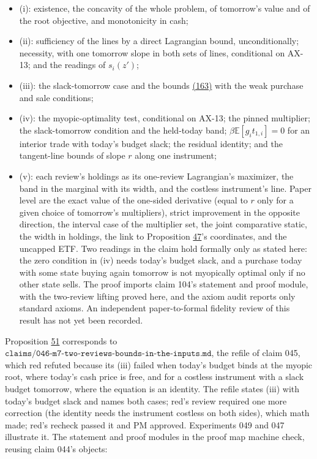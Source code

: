 \documentclass[11pt]{article}
\begin{document}
\begin{itemize}
  \item (i): existence, the concavity of the whole problem, of tomorrow's
  value and of the root objective, and monotonicity in cash;
  \item (ii): sufficiency of the lines by a direct Lagrangian bound,
  unconditionally; necessity, with one tomorrow slope in both sets of
  lines, conditional on AX-13; and the readings of \(s_i(z')\);
  \item (iii): the slack-tomorrow case and the bounds \hyperref[eq:163]{(163)} with the weak
  purchase and sale conditions;
  \item (iv): the myopic-optimality test, conditional on AX-13; the pinned
  multiplier; the slack-tomorrow condition and the held-today band;
  \(\beta\mathbb E[g_it_{1,i}]=0\) for an interior trade with today's budget slack; the
  residual identity; and the tangent-line bounds of slope \(r\) along one
  instrument;
  \item (v): each review's holdings as its one-review Lagrangian's maximizer,
  the band in the marginal with its width, and the costless instrument's
  line.
Paper level are the exact value of the one-sided derivative (equal to
\(r\) only for a given choice of tomorrow's multipliers), strict improvement
in the opposite direction, the interval case of the multiplier set, the
joint comparative static, the width in holdings, the link to
Proposition \hyperref[res:Proposition-47]{47}'s coordinates, and the uncapped ETF. Two readings in the
claim hold formally only as stated here: the zero condition in (iv)
needs today's budget slack, and a purchase today with some state
buying again tomorrow is not myopically optimal only if no other state
sells. The proof imports claim 104's statement and proof module, with
the two-review lifting proved here, and the axiom audit reports only
standard axioms. An independent paper-to-formal fidelity review of
this result has not yet been recorded.
\end{itemize}

Proposition \hyperref[res:Proposition-51]{51} corresponds to
\(\texttt{claims/046-m7-two-reviews-bounds-in-the-inputs.md}\), the refile of claim
045, which red refuted because its (iii) failed when today's budget
binds at the myopic root, where today's cash price is free, and for a
costless instrument with a slack budget tomorrow, where the equation is
an identity. The refile states (iii) with today's budget slack and
names both cases; red's review required one more correction (the
identity needs the instrument costless on both sides), which math made;
red's recheck passed it and PM approved. Experiments 049 and 047
illustrate it. The statement and proof modules in the proof map machine
check, reusing claim 044's objects:
\end{document}
